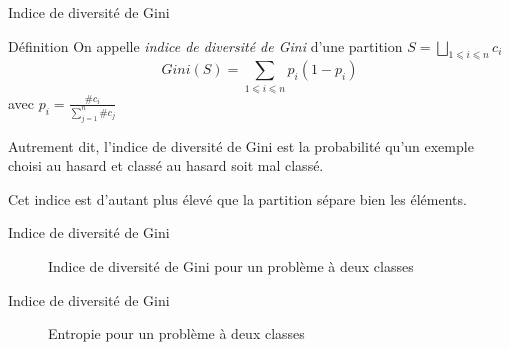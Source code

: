 \documentclass[xcolor={svgnames}, french]{beamer}
\begin{document}
\begin{frame}{Indice de diversité de Gini}
    \begin{block}{Définition}
        On appelle \emph{indice de diversité de Gini} d'une partition $S=⨆_{1⩽i⩽n}c_i$
        \begin{equation}
            Gini(S) = ∑_{1⩽i⩽n}p_i(1-p_i)
        \end{equation}
        avec $p_i=\frac{\#c_i}{∑_{j=1}^n\#c_j}$
    \end{block}
    Autrement dit, l'indice de diversité de Gini est la probabilité qu'un exemple choisi au hasard et classé au hasard soit mal classé.

	Cet indice est d'autant plus élevé que la partition sépare bien les éléments.
\end{frame}

\begin{frame}{Indice de diversité de Gini}
    \begin{figure}
        \tikzset{external/export=true}
        \caption{Indice de diversité de Gini pour un problème à deux classes}
    \end{figure}
\end{frame}

\begin{frame}{Indice de diversité de Gini}
    \begin{figure}
        \tikzset{external/export=true}
        \caption{Entropie pour un problème à deux classes}
    \end{figure}
\end{frame}
\end{document}
